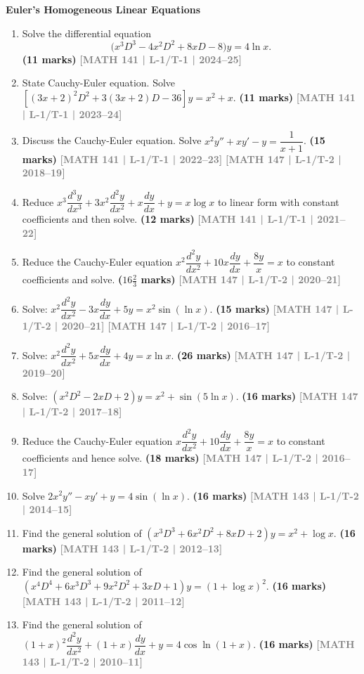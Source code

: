 \documentclass[12pt,a3paper]{article}
\newcommand{\yr}[1]{\hfill\textcolor{gray}{\small\textbf{[#1]}}}
\newcommand{\mk}[1]{\textcolor{orange!70!black}{\small\textbf{(#1 marks)}}}
\newcommand{\subtopic}[2]{%
  \vspace{10pt}
  \noindent\begin{tcolorbox}[colback=#1!8,colframe=#1,boxrule=0.6pt,arc=4pt,
    left=6pt,right=6pt,top=4pt,bottom=4pt]
    \small\bfseries\textcolor{#1}{#2}
  \end{tcolorbox}
  \vspace{2pt}
}
\begin{document}
\subtopic{cC}{Euler's Homogeneous Linear Equations}
\label{sub:s3-euler}

\begin{enumerate}
  
\item Solve the differential equation
    \[
      \bigl(x^{3}D^{3}-4x^{2}D^{2}+8xD-8\bigr)y=4\ln x.
    \]
\mk{11}  \yr{MATH 141 | L-1/T-1 | 2024--25}
  
\item State Cauchy-Euler equation. Solve $[(3x+2)^{2}D^{2}+3(3x+2)D-36]y=x^{2}+x$.
\mk{11} \yr{MATH 141 | L-1/T-1 | 2023--24}

\item Discuss the Cauchy-Euler equation. Solve $x^{2}y''+xy'-y=\dfrac{1}{x+1}$.
\mk{15} \yr{MATH 141 | L-1/T-1 | 2022--23} \yr{MATH 147 | L-1/T-2 | 2018--19}

\item Reduce $x^{3}\dfrac{d^{3}y}{dx^{3}}+3x^{2}\dfrac{d^{2}y}{dx^{2}}+x\dfrac{dy}{dx}+y=x\log x$ to linear form with constant coefficients and then solve.
\mk{12} \yr{MATH 141 | L-1/T-1 | 2021--22}

\item Reduce the Cauchy-Euler equation $x^{2}\dfrac{d^{2}y}{dx^{2}}+10x\dfrac{dy}{dx}+\dfrac{8y}{x}=x$ to constant coefficients and solve.
\mk{$16\tfrac{2}{3}$} \yr{MATH 147 | L-1/T-2 | 2020--21}

\item Solve: $x^{2}\dfrac{d^{2}y}{dx^{2}}-3x\dfrac{dy}{dx}+5y=x^{2}\sin(\ln x)$.
\mk{15} \yr{MATH 147 | L-1/T-2 | 2020--21} \yr{MATH 147 | L-1/T-2 | 2016--17}

\item Solve: $x^{2}\dfrac{d^{2}y}{dx^{2}}+5x\dfrac{dy}{dx}+4y=x\ln x$.
\mk{26} \yr{MATH 147 | L-1/T-2 | 2019--20}

\item Solve: $(x^{2}D^{2}-2xD+2)y=x^{2}+\sin(5\ln x)$.
\mk{16} \yr{MATH 147 | L-1/T-2 | 2017--18}

\item Reduce the Cauchy-Euler equation $x\dfrac{d^{2}y}{dx^{2}}+10\dfrac{dy}{dx}+\dfrac{8y}{x}=x$ to constant coefficients and hence solve.
\mk{18} \yr{MATH 147 | L-1/T-2 | 2016--17}

\item Solve $2x^{2}y''-xy'+y=4\sin(\ln x)$.
\mk{16} \yr{MATH 143 | L-1/T-2 | 2014--15}

\item Find the general solution of $(x^{3}D^{3}+6x^{2}D^{2}+8xD+2)y=x^{2}+\log x$.
\mk{16} \yr{MATH 143 | L-1/T-2 | 2012--13}

\item Find the general solution of $(x^{4}D^{4}+6x^{3}D^{3}+9x^{2}D^{2}+3xD+1)y=(1+\log x)^{2}$.
\mk{16} \yr{MATH 143 | L-1/T-2 | 2011--12}

\item Find the general solution of $(1+x)^{2}\dfrac{d^{2}y}{dx^{2}}+(1+x)\dfrac{dy}{dx}+y=4\cos\ln(1+x)$.
\mk{16\textonehalf} \yr{MATH 143 | L-1/T-2 | 2010--11}

\end{enumerate}
\end{document}

